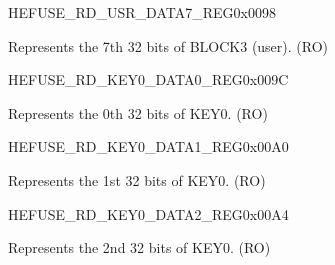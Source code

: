 \begin{register}{H}{EFUSE\_RD\_USR\_DATA7\_REG}{0x0098}\label{regdesc:EFUSERDUSRDATA7REG}
%
\regnewline%
\begin{regdesc}\begin{reglist}
\label{fielddesc:EFUSEUSRDATA7}\item [EFUSE\_USR\_DATA7] Represents the 7th 32 bits of BLOCK3 (user). (RO)
\end{reglist}\end{regdesc}
\end{register}


\begin{register}{H}{EFUSE\_RD\_KEY0\_DATA0\_REG}{0x009C}\label{regdesc:EFUSERDKEY0DATA0REG}
%
\regnewline%
\begin{regdesc}\begin{reglist}
\label{fielddesc:EFUSEKEY0DATA0}\item [EFUSE\_KEY0\_DATA0] Represents the 0th 32 bits of KEY0. (RO)
\end{reglist}\end{regdesc}
\end{register}


\begin{register}{H}{EFUSE\_RD\_KEY0\_DATA1\_REG}{0x00A0}\label{regdesc:EFUSERDKEY0DATA1REG}
%
\regnewline%
\begin{regdesc}\begin{reglist}
\label{fielddesc:EFUSEKEY0DATA1}\item [EFUSE\_KEY0\_DATA1] Represents the 1st 32 bits of KEY0. (RO)
\end{reglist}\end{regdesc}
\end{register}


\begin{register}{H}{EFUSE\_RD\_KEY0\_DATA2\_REG}{0x00A4}\label{regdesc:EFUSERDKEY0DATA2REG}
%
\regnewline%
\begin{regdesc}\begin{reglist}
\label{fielddesc:EFUSEKEY0DATA2}\item [EFUSE\_KEY0\_DATA2] Represents the 2nd 32 bits of KEY0. (RO)
\end{reglist}\end{regdesc}
\end{register}


